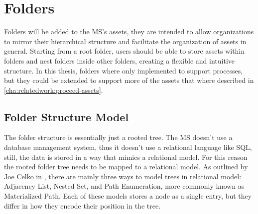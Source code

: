 
%

\section{Folders}
\label{cha:conceptanddesign:folders}

Folders will be added to the MS's assets,
they are intended to allow organizations to mirror their hierarchical structure and
facilitate the organization of assets in general.
Starting from a root folder, users should be able to store assets within folders and nest
folders inside other folders, creating a flexible and intuitive structure.
In this thesis, folders where only implemented to support processes, but they could be extended to
support more of the assets that where described in \ref{cha:relatedwork:proceed-assets}.

\subsection{Folder Structure Model}


The folder structure is essentially just a rooted tree.
The MS doesn't use a database management system, thus it doesn't use a relational
language like SQL, still, the data is stored in a way that mimics a relational model.
For this reason the rooted folder tree needs to be mapped to a relational model.
%
As outlined by Joe Celko in \cite{celkoSQLTrees}, there are mainly three ways to model
trees in relational model:
Adjacency List, Nested Set, and  Path Enumeration, more commonly known as Materialized Path.
Each of these models stores a node as a single entry, but they differ in how they encode
their position in the tree.

